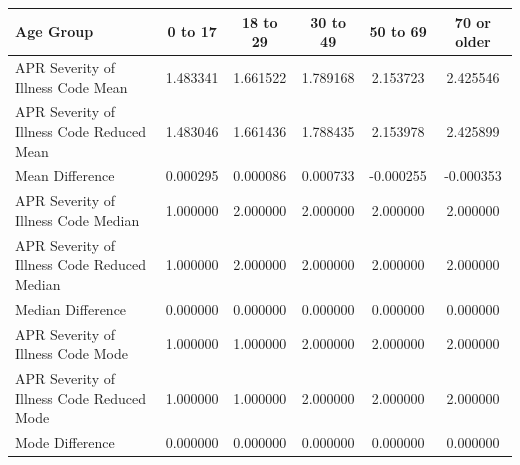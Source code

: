 \documentclass[
	letterpaper, %
]{jdf}
\begin{document}
\begin{jdftable}
\label{table:Example}
\small %
\begin{tabular}{@{} l c c c c c}
\textbf{Age Group} & \textbf{0 to 17} &\textbf{18 to 29} & \textbf{30 to 49} & \textbf{50 to 69} & \textbf{70 or older}\\
	\toprule[0.5pt]
APR Severity of Illness Code Mean           &  1.483341 &  1.661522 &  1.789168 &  2.153723 &     2.425546 \\
\midrule
APR Severity of Illness Code Reduced Mean   &  1.483046 &  1.661436 &  1.788435 &  2.153978 &     2.425899 \\
\midrule
Mean Difference                             &  0.000295 &  0.000086 &  0.000733 & -0.000255 &    -0.000353 \\
\midrule
APR Severity of Illness Code Median         &  1.000000 &  2.000000 &  2.000000 &  2.000000 &     2.000000 \\
\midrule
APR Severity of Illness Code Reduced Median &  1.000000 &  2.000000 &  2.000000 &  2.000000 &     2.000000 \\
\midrule
Median Difference                           &  0.000000 &  0.000000 &  0.000000 &  0.000000 &     0.000000 \\
\midrule
APR Severity of Illness Code Mode           &  1.000000 &  1.000000 &  2.000000 &  2.000000 &     2.000000 \\
\midrule
APR Severity of Illness Code Reduced Mode   &  1.000000 &  1.000000 &  2.000000 &  2.000000 &     2.000000 \\
\midrule
Mode Difference                             &  0.000000 &  0.000000 &  0.000000 &  0.000000 &     0.000000 \\
\end{tabular}
\end{jdftable}
\end{document}
